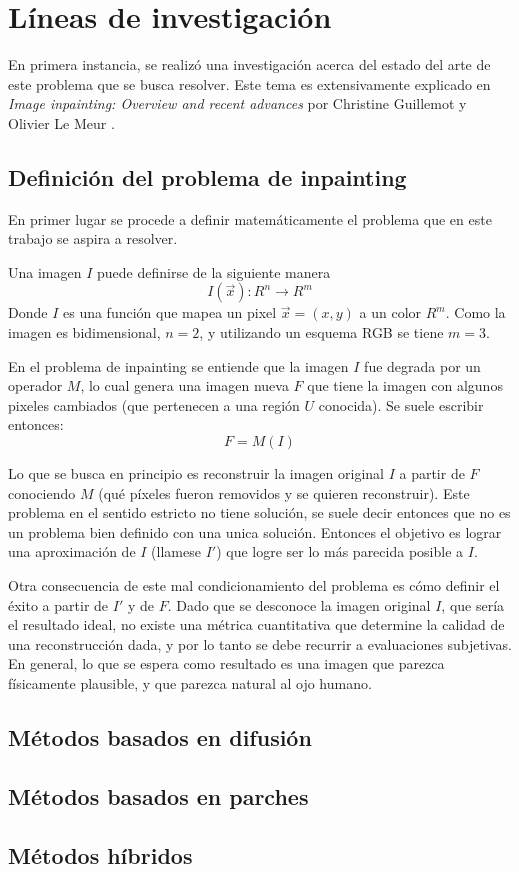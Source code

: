 \documentclass[assd_tpf_main.tex]{subfiles}
\begin{document}
\section{L\'ineas de investigaci\'on}

En primera instancia, se realiz\'o una investigaci\'on acerca 
del estado del arte de este problema que se busca resolver.
Este tema es extensivamente explicado en \textit{Image inpainting: Overview and recent advances} por Christine Guillemot y Olivier Le Meur \cite{b3}.

\subsection{Definici\'on del problema de inpainting}

En primer lugar se procede a definir matemáticamente el problema que en este trabajo se aspira a resolver. 

Una imagen $I$ puede definirse de la siguiente manera
\begin{equation}
I(\vec x): R^{n} \to R^{m}
\end{equation}
Donde $I$ es una función que mapea un pixel $\vec x=(x,y)$ a un color $R^{m}$. Como la imagen es bidimensional, $n=2$, y utilizando un esquema RGB se tiene $m=3$.

En el problema de inpainting se entiende que la imagen $I$ fue degrada por un operador $M$, lo cual genera una imagen nueva $F$ que tiene la imagen con algunos pixeles cambiados (que pertenecen a una región $U$ conocida). Se suele escribir entonces:
\begin{equation}
F=M(I)
\end{equation}

Lo que se busca en principio es reconstruir la imagen original $I$ a partir de $F$ conociendo $M$ (qu\'e p\'ixeles fueron removidos y se quieren reconstruir). Este problema en el sentido estricto no tiene solución, se suele decir entonces que no es un problema bien definido con una unica solución.
Entonces el objetivo es lograr una aproximación de $I$ (llamese $I'$) que logre ser lo más parecida posible a $I$.

Otra consecuencia de este mal condicionamiento del problema es c\'omo definir el \'exito a partir de $I'$ y de $F$. Dado que se desconoce la imagen original $I$, que ser\'ia el resultado ideal, no existe una m\'etrica cuantitativa que determine la calidad de una reconstrucci\'on dada, y por lo tanto se debe recurrir a evaluaciones subjetivas. En general, lo que se espera como resultado es una imagen que parezca f\'isicamente plausible, y que parezca natural al ojo humano.

\subsection{Métodos basados en difusión}


\subsection{Métodos basados en parches}


\subsection{M\'etodos h\'ibridos}
\end{document}
